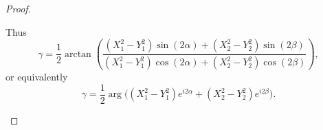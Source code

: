 \documentclass[10pt,a4paper]{amsart}
\begin{document}
\begin{proof}
\begin{enumerate}
Thus
\[
\gamma = \frac{1}{2} \arctan \left( \frac{(X_1^2-Y_1^2)\sin(2\alpha) + (X_2^2-Y_2^2)\sin(2\beta)}{ (X_1^2-Y_1^2)\cos(2\alpha) + (X_2^2-Y_2^2)\cos(2\beta)} \right),
\]
or equivalently
\[
\gamma = \frac12 \arg\Big( (X_1^2-Y_1^2)e^{i2\alpha} + (X_2^2-Y_2^2)e^{i2\beta} \Big).
\]

\end{enumerate}
\end{proof}
\end{document}
